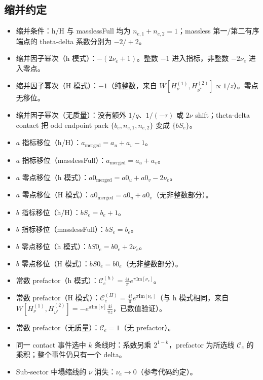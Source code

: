 ﻿\documentclass[a4paper,11pt]{article}
\begin{document}
\subsection{缩并约定}

\begin{itemize}
  \item 缩并条件：h/H 与 masslessFull 均为 $n_{e,1}+n_{e,2}=1$；massless 第一/第二有序端点的 theta-delta 系数分别为 $-2/+2$。
  \item 缩并因子幂次（h 模式）：$-(2\nu_e+1)$。整数 $-1$ 进入指标，非整数 $-2\nu_e$ 进入零点。
  \item 缩并因子幂次（H 模式）：$-1$（纯整数，来自 $W[H_\nu^{(1)}, H_{\nu^*}^{(2)}] \propto 1/z$）。零点无移位。
  \item 缩并因子幂次（无质量）：没有额外 $1/q$、$1/(-\tau)$ 或 $2\nu$ shift；theta-delta contact 把 odd endpoint pack $\{b_e,n_{e,1},n_{e,2}\}$ 变成 $\{bS_e\}$。
  \item $a$ 指标移位（h/H）：$a_{\text{merged}} = a_u + a_v - 1$。
  \item $a$ 指标移位（masslessFull）：$a_{\text{merged}} = a_u + a_v$。
  \item $a$ 零点移位（h 模式）：$a0_{\text{merged}} = a0_u + a0_v - 2\nu_e$。
  \item $a$ 零点移位（H 模式）：$a0_{\text{merged}} = a0_u + a0_v$（无非整数部分）。
  \item $b$ 指标移位（h/H）：$bS_e=b_e+1$。
  \item $b$ 指标移位（masslessFull）：$bS_e=b_e$。
  \item $b$ 零点移位（h 模式）：$bS0_e = b0_e + 2\nu_e$。
  \item $b$ 零点移位（H 模式）：$bS0_e = b0_e$（无非整数部分）。
  \item 常数 prefactor（h 模式）：$\mathcal{C}_e^{(h)} = \frac{4i}{\pi} e^{\pi \text{Im}[\nu_e]}$。
  \item 常数 prefactor（H 模式）：$\mathcal{C}_e^{(H)} = \frac{4i}{\pi} e^{\pi \text{Im}[\nu_e]}$（与 h 模式相同，来自 $W[H_\nu^{(1)}, H_{\nu^*}^{(2)}] = -e^{\pi \text{Im}[\nu]} \frac{4i}{\pi z}$，已数值验证）。
  \item 常数 prefactor（无质量）：$\mathcal{C}_e = 1$（无 prefactor）。
  \item 同一 contact 事件选中 $k$ 条线时：系数另乘 $2^{1-k}$，prefactor 为所选线 $\mathcal C_e$ 的乘积；整个事件仍只有一个 delta。
  \item Sub-sector 中塌缩线的 $\nu$ 消失：$\nu_e \to 0$（参考代码约定）。
\end{itemize}
\end{document}
